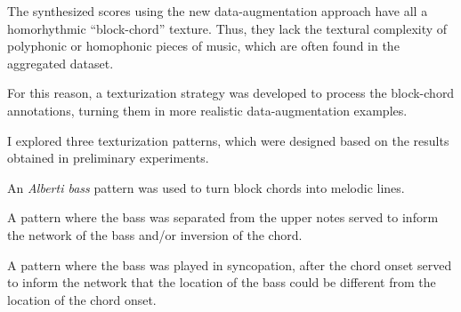 
The synthesized scores using the new data-augmentation
approach have all a homorhythmic ``block-chord'' texture.
Thus, they lack the textural complexity of polyphonic or
homophonic pieces of music, which are often found in the
aggregated dataset.

For this reason, a texturization strategy was developed to
process the block-chord annotations, turning them in more
realistic data-augmentation examples.

I explored three texturization patterns, which were designed
based on the results obtained in preliminary experiments. 


An \emph{Alberti bass} pattern was used to turn block chords
into melodic lines.


A pattern where the bass was separated from the upper notes
served to inform the network of the bass and/or inversion of
the chord.


A pattern where the bass was played in syncopation, after
the chord onset served to inform the network that the
location of the bass could be different from the location of
the chord onset.